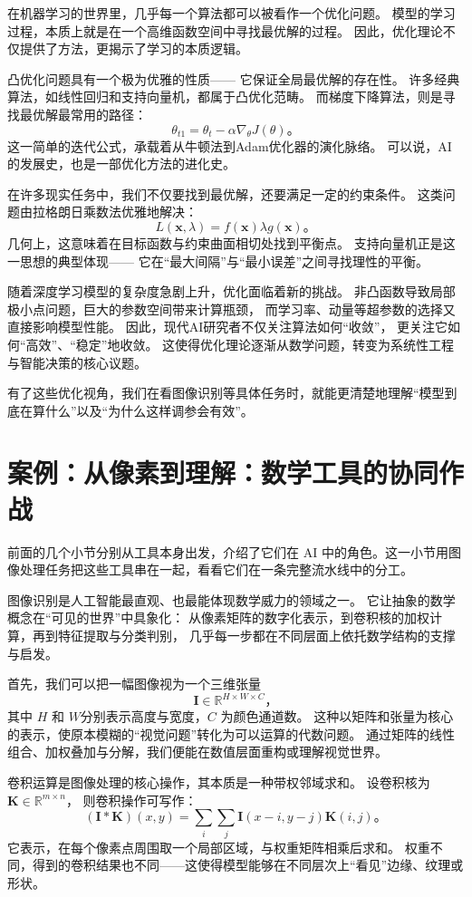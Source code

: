 在机器学习的世界里，几乎每一个算法都可以被看作一个优化问题。  
模型的学习过程，本质上就是在一个高维函数空间中寻找最优解的过程。  
因此，优化理论不仅提供了方法，更揭示了学习的本质逻辑。

凸优化问题具有一个极为优雅的性质——  
它保证全局最优解的存在性。  
许多经典算法，如线性回归和支持向量机，都属于凸优化范畴。  
而梯度下降算法，则是寻找最优解最常用的路径：  
$$\theta_{t1} = \theta_t - \alpha \nabla_\theta J(\theta)。$$  
这一简单的迭代公式，承载着从牛顿法到Adam优化器的演化脉络。  
可以说，AI的发展史，也是一部优化方法的进化史。

在许多现实任务中，我们不仅要找到最优解，还要满足一定的约束条件。  
这类问题由拉格朗日乘数法优雅地解决：
$$L(\mathbf{x}, \lambda) = f(\mathbf{x})  \lambda g(\mathbf{x})。$$  
几何上，这意味着在目标函数与约束曲面相切处找到平衡点。  
支持向量机正是这一思想的典型体现——  
它在“最大间隔”与“最小误差”之间寻找理性的平衡。

随着深度学习模型的复杂度急剧上升，优化面临着新的挑战。  
非凸函数导致局部极小点问题，巨大的参数空间带来计算瓶颈，  
而学习率、动量等超参数的选择又直接影响模型性能。  
因此，现代AI研究者不仅关注算法如何“收敛”，  
更关注它如何“高效”、“稳定”地收敛。  
这使得优化理论逐渐从数学问题，转变为系统性工程与智能决策的核心议题。

有了这些优化视角，我们在看图像识别等具体任务时，就能更清楚地理解“模型到底在算什么”以及“为什么这样调参会有效”。

\section{案例：从像素到理解：数学工具的协同作战}
前面的几个小节分别从工具本身出发，介绍了它们在 AI 中的角色。这一小节用图像处理任务把这些工具串在一起，看看它们在一条完整流水线中的分工。

图像识别是人工智能最直观、也最能体现数学威力的领域之一。  
它让抽象的数学概念在“可见的世界”中具象化：  
从像素矩阵的数字化表示，到卷积核的加权计算，再到特征提取与分类判别，  
几乎每一步都在不同层面上依托数学结构的支撑与启发。

首先，我们可以把一幅图像视为一个三维张量  
$$\mathbf{I} \in \mathbb{R}^{H \times W \times C}，$$  
其中 $H$ 和 $W$分别表示高度与宽度，$C$ 为颜色通道数。  
这种以矩阵和张量为核心的表示，使原本模糊的“视觉问题”转化为可以运算的代数问题。  
通过矩阵的线性组合、加权叠加与分解，我们便能在数值层面重构或理解视觉世界。

卷积运算是图像处理的核心操作，其本质是一种带权邻域求和。  
设卷积核为 $\mathbf{K} \in \mathbb{R}^{m \times n}$，  
则卷积操作可写作：
$$
(\mathbf{I} * \mathbf{K})(x, y) = \sum_i \sum_j \mathbf{I}(x-i, y-j)\mathbf{K}(i, j)。
$$  
它表示，在每个像素点周围取一个局部区域，与权重矩阵相乘后求和。  
权重不同，得到的卷积结果也不同——这使得模型能够在不同层次上“看见”边缘、纹理或形状。

